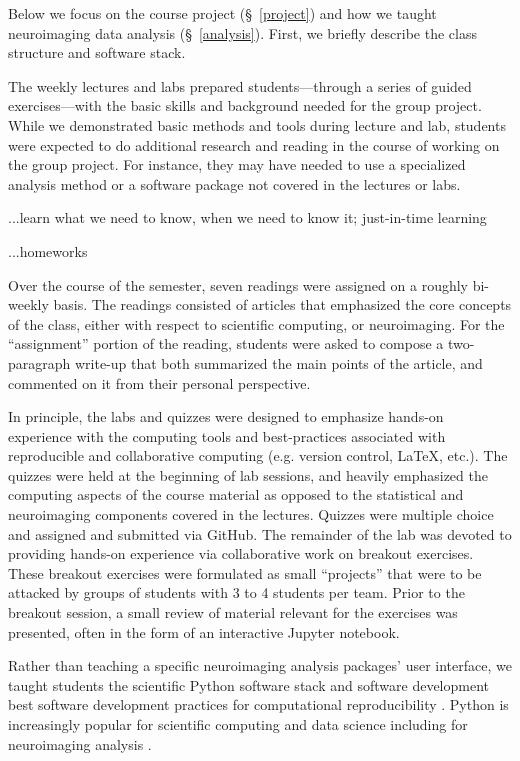 Below we focus on the course project (\S~\ref{project}) and
how we taught neuroimaging data analysis (\S~\ref{analysis}).
First, we briefly describe the class structure and software stack.

The weekly lectures and labs prepared students---through a
series of guided exercises---with the basic skills and
background needed for the group project.
While we demonstrated basic methods and tools during lecture and lab,
students were expected to do additional research and reading in the course
of working on the group project.
For instance, they may have needed to use a specialized analysis
method or a software package not covered in the lectures or labs.

...learn what we need to know, when we need to know it; just-in-time learning 

...homeworks

Over the course of the semester, seven readings were assigned on a roughly
bi-weekly basis.
The readings consisted of articles that emphasized the core concepts
of the class, either with respect to scientific computing, or neuroimaging.
For the ``assignment'' portion of the reading, students were asked to compose
a two-paragraph write-up that both summarized the main points of the article,
and commented on it from their personal perspective.

In principle, the labs and quizzes were designed to emphasize hands-on 
experience with the computing tools and best-practices associated with
reproducible and collaborative computing (e.g. version control, \LaTeX, etc.).
The quizzes were held at the beginning of lab sessions, and heavily emphasized
the computing aspects of the course material as opposed to the statistical and
neuroimaging components covered in the lectures.
Quizzes were multiple choice and assigned and submitted via GitHub.
The remainder of the lab was devoted to providing hands-on experience via
collaborative work on breakout exercises.
These breakout exercises were formulated as small ``projects'' that were to be
attacked by groups of students with 3 to 4 students per team.
Prior to the breakout session, a small review of material relevant for the 
exercises was presented, often in the form of an interactive Jupyter notebook.

Rather than teaching a specific neuroimaging analysis packages' user interface,
we taught students the scientific Python software stack
\citep{millman2011python, perez2011python} and software development best
software development practices for computational reproducibility \citep{millman2014developing}.
Python is increasingly popular for scientific computing and data science
including for neuroimaging analysis \citep{millman2007analysis}.


